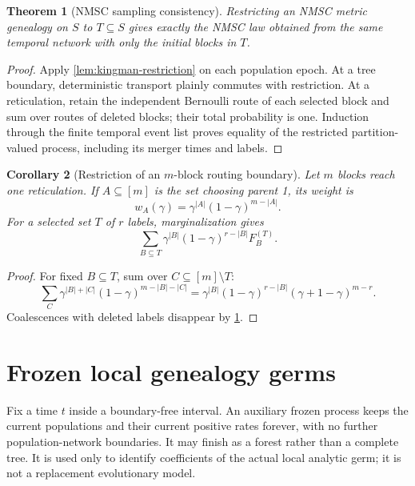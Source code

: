 \documentclass[11pt]{article}
\newtheorem{theorem}{Theorem}[section]
\newtheorem{corollary}[theorem]{Corollary}
\begin{document}
\begin{theorem}[NMSC sampling consistency]
\label{thm:sampling}
Restricting an NMSC metric genealogy on $S$ to $T\subseteq S$ gives exactly the NMSC law obtained from the same temporal network with only the initial blocks in $T$.
\end{theorem}

\begin{proof}
Apply \cref{lem:kingman-restriction} on each population epoch.  At a tree boundary, deterministic transport plainly commutes with restriction.  At a reticulation, retain the independent Bernoulli route of each selected block and sum over routes of deleted blocks; their total probability is one.  Induction through the finite temporal event list proves equality of the restricted partition-valued process, including its merger times and labels.
\end{proof}

\begin{corollary}[Restriction of an $m$-block routing boundary]
\label{cor:routing-restriction}
Let $m$ blocks reach one reticulation.  If $A\subseteq[m]$ is the set choosing parent 1, its weight is
\[
 w_A(\gamma)=\gamma^{|A|}(1-\gamma)^{m-|A|}.
\]
For a selected set $T$ of $r$ labels, marginalization gives
\[
 \sum_{B\subseteq T}\gamma^{|B|}(1-\gamma)^{r-|B|}F_B^{(T)}.
\]
\end{corollary}

\begin{proof}
For fixed $B\subseteq T$, sum over $C\subseteq[m]\setminus T$:
\[
 \sum_C\gamma^{|B|+|C|}(1-\gamma)^{m-|B|-|C|}
 =\gamma^{|B|}(1-\gamma)^{r-|B|}
 (\gamma+1-\gamma)^{m-r}.
\]
Coalescences with deleted labels disappear by \cref{thm:sampling}.
\end{proof}


\section{Frozen local genealogy germs}
\label{sec:frozen}
Fix a time $t$ inside a boundary-free interval. An auxiliary frozen process keeps the current populations and their current positive rates forever, with no further population-network boundaries. It may finish as a forest rather than a complete tree. It is used only to identify coefficients of the actual local analytic germ; it is not a replacement evolutionary model.
\end{document}

